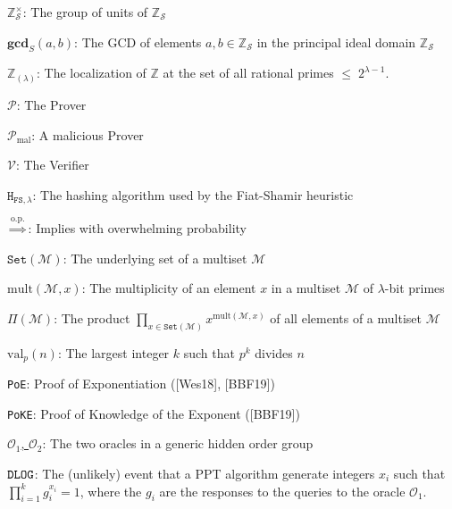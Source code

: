 \documentclass[11pt, lettersize, notitlepage, leqno, footskip=0.6cm]{article}
\newcommand{\bz}{\mathbb Z}
\newcommand{\pl}{\prod\limits}
\newcommand{\ttt}{\texttt}
\newcommand{\sett}{\ttt{Set}}
\newcommand{\mc}{\mathcal}
\newcommand{\mbf}{\mathbf}
\newcommand{\mr}{\mathrm}
\newcommand{\lam}{\lambda}
\newcommand{\bzs}{\bz_{\mc{S}}}
\newcommand{\noin}{\noindent}
\newcommand{\GCD}{\mbf{gcd}}
\numberwithin{equation}{section}
\begin{document}
{{{\noin $\bzs^{\times}$: The group of units of $\bzs$ \vspace{0.1cm}

\noin $\GCD_S(a, b)$: The GCD of elements $a,b\in \bz_{\mc{S}}$ in the principal ideal domain $\bz_{\mc{S}}$ \vspace{0.1cm}

\noin $\bz_{(\lam)}$: The localization of $\bz$ at the set of all rational primes $\leq\; 2^{\lam-1}$. \vspace{0.1cm}

\noin $\mc{P}$: The Prover \vspace{0.1cm}

\noin $\mc{P}_{\mr{mal}}$: A malicious Prover \vspace{0.1cm}

\noin $\mc{V}$: The Verifier \vspace{0.1cm}

\noin $\ttt{H}_{\ttt{FS}, \lam}$: The hashing algorithm used by the Fiat-Shamir heuristic \vspace{0.1cm}

\noin $\overset{\mr{o.p.}}{\Longrightarrow}$: Implies with overwhelming probability \vspace{0.1cm}

\noin $\sett(\mc{M})$: The underlying set of a multiset $\mc{M}$ \vspace{0.1cm}

\noin $\mr{mult}(\mc{M},x)$: The multiplicity of an element $x$ in a multiset $\mc{M}$ of $\lam$-bit primes \vspace{0.1cm}

\noin $\Pi(\mc{M})$: The product $\pl_{x\in \sett(\mc{M})} x^{\mr{mult}(\mc{M},x)}$ of all elements of a multiset $\mc{M}$ \vspace{0.1cm}

\noin $\mr{val}_p(n)$: The largest integer $k$ such that $p^k$ divides $n$ \vspace{0.1cm}

\noin \verb|PoE|: Proof of Exponentiation ([Wes18], [BBF19])\vspace{0.1cm}

\noin \verb|PoKE|: Proof of Knowledge of the Exponent ([BBF19]) \vspace{0.1cm}

\noin \hyperlink{Oracles}{$\mc{O}_1$, $\mc{O}_2$}: The two oracles in a generic hidden order group \vspace{0.1cm}

\noin \hyperlink{DLOG}{$\tt{DLOG}$}: The (unlikely) event that a PPT algorithm generate integers $x_i$ such that $\prod_{i=1}^k g_i^{x_i} = 1$, where the $g_i$ are the responses to the queries to the oracle $\mc{O}_1.$

}}}
\end{document}
